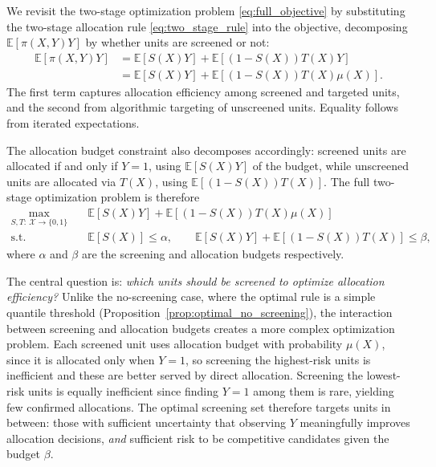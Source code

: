 We revisit the two-stage optimization problem \eqref{eq:full_objective} by substituting the two-stage allocation rule \eqref{eq:two_stage_rule} into the objective, decomposing $\mathbb{E}[\pi(X,Y)Y]$ by whether units are screened or not:
\begin{align}
\mathbb{E}[\pi(X,Y)Y] &= \mathbb{E}[S(X)Y] + \mathbb{E}[(1-S(X))T(X)Y]  \\
&= \mathbb{E}[S(X)Y] + \mathbb{E}[(1-S(X))T(X)\mu(X)] \nonumber.
\end{align}
The first term captures allocation efficiency among screened and targeted units, and the second from algorithmic targeting of unscreened units. Equality follows from iterated expectations.

The allocation budget constraint also decomposes accordingly: screened units are allocated if and only if $Y=1$, using $\mathbb{E}[S(X)Y]$ of the budget, while unscreened units are allocated via $T(X)$, using $\mathbb{E}[(1-S(X))T(X)]$. The full two-stage optimization problem is therefore
\begin{align}
\label{eq:two_stage_opt}
\max_{S, T: ~\mathcal{X} \to \{0,1\}} \quad 
    & \mathbb{E}[S(X) Y] + \mathbb{E}[(1-S(X)) T(X) \mu(X)] \\
\text{s.t.} \quad
    & \mathbb{E}[S(X)] \leq \alpha, \quad\quad \mathbb{E}[S(X) Y] + \mathbb{E}[(1-S(X)) T(X)] \leq \beta, \nonumber
\end{align}
where $\alpha$ and $\beta$ are the screening and allocation budgets respectively.

The central question is: \textit{which units should be screened to optimize allocation efficiency?} Unlike the no-screening case, where the optimal rule is a simple quantile threshold (Proposition~\ref{prop:optimal_no_screening}), the interaction between screening and allocation budgets creates a more complex optimization problem. Each screened unit uses allocation budget with probability $\mu(X)$, since it is allocated only when $Y=1$, so screening the highest-risk units is inefficient and these are better served by direct allocation. Screening the lowest-risk units is equally inefficient since finding $Y=1$ among them is rare, yielding few confirmed allocations. The optimal screening set therefore targets units in between: those with sufficient uncertainty that observing $Y$ meaningfully improves allocation decisions, \textit{and} sufficient risk to be competitive candidates given the budget $\beta$.

